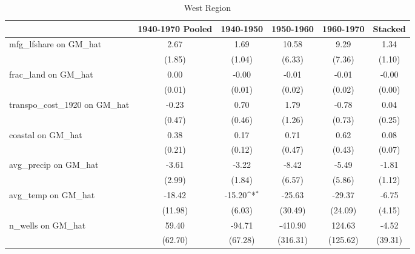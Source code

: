 \begin{table}[htbp]\centering
\def\sym#1{\ifmmode^{#1}\else\(^{#1}\)\fi}
\caption{West Region}
\begin{tabular}{l*{5}{c}}
\toprule
                &\multicolumn{1}{c}{1940-1970 Pooled}&\multicolumn{1}{c}{1940-1950}&\multicolumn{1}{c}{1950-1960}&\multicolumn{1}{c}{1960-1970}&\multicolumn{1}{c}{Stacked}\\
\midrule
mfg\_lfshare on GM\_hat&     2.67         &     1.69         &    10.58         &     9.29         &     1.34         \\
                &   (1.85)         &   (1.04)         &   (6.33)         &   (7.36)         &   (1.10)         \\
\addlinespace
frac\_land on GM\_hat&     0.00         &    -0.00         &    -0.01         &    -0.01         &    -0.00         \\
                &   (0.01)         &   (0.01)         &   (0.02)         &   (0.02)         &   (0.00)         \\
\addlinespace
transpo\_cost\_1920 on GM\_hat&    -0.23         &     0.70         &     1.79         &    -0.78         &     0.04         \\
                &   (0.47)         &   (0.46)         &   (1.26)         &   (0.73)         &   (0.25)         \\
\addlinespace
coastal on GM\_hat&     0.38         &     0.17         &     0.71         &     0.62         &     0.08         \\
                &   (0.21)         &   (0.12)         &   (0.47)         &   (0.43)         &   (0.07)         \\
\addlinespace
avg\_precip on GM\_hat&    -3.61         &    -3.22         &    -8.42         &    -5.49         &    -1.81         \\
                &   (2.99)         &   (1.84)         &   (6.57)         &   (5.86)         &   (1.12)         \\
\addlinespace
avg\_temp on GM\_hat&   -18.42         &   -15.20\sym{*}  &   -25.63         &   -29.37         &    -6.75         \\
                &  (11.98)         &   (6.03)         &  (30.49)         &  (24.09)         &   (4.15)         \\
\addlinespace
n\_wells on GM\_hat&    59.40         &   -94.71         &  -410.90         &   124.63         &    -4.52         \\
                &  (62.70)         &  (67.28)         & (316.31)         & (125.62)         &  (39.31)         \\

\end{tabular}
\end{table}
